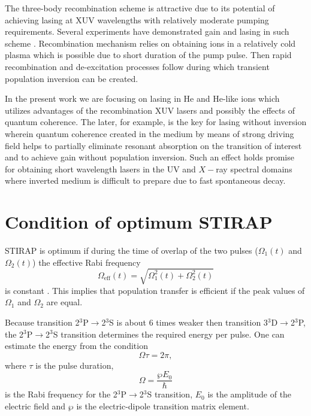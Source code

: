 \documentclass[preprint,preprintnumbers]{revtex4}
\begin{document}
The three-body recombination scheme is attractive due to its potential of
achieving lasing at XUV wavelengths with relatively moderate pumping
requirements. Several experiments have demonstrated gain and lasing in such
scheme \cite{Naga93,Krus96,Koro96}. Recombination mechanism relies on
obtaining ions in a relatively cold plasma which is possible due to short
duration of the pump pulse. Then rapid recombination and de-excitation
processes follow during which transient population inversion can be created.

In the present work we are focusing on lasing in He and He-like ions which
utilizes advantages of the recombination XUV lasers and possibly the effects
of quantum coherence. The later, for example, is the key for lasing without
inversion wherein quantum coherence created in the medium by means of strong
driving field helps to partially eliminate resonant absorption on the
transition of interest and to achieve gain without population inversion.
Such an effect holds promise for obtaining short wavelength lasers in the UV
and $X-$ray spectral domains where inverted medium is difficult to prepare
due to fast spontaneous decay.

\appendix

\section{Condition of optimum STIRAP}

STIRAP is optimum if during the time of overlap of the two pulses ($\Omega
_{1}(t)$ and $\Omega _{2}(t)$) the effective Rabi frequency
\begin{equation}
\Omega _{\text{eff}}(t)=\sqrt{\Omega _{1}^{2}(t)+\Omega _{2}^{2}(t)}
\end{equation}%
is constant \cite{Berg98}. This implies that population transfer is
efficient if the peak values of $\Omega _{1}$ and $\Omega _{2}$ are equal.

Because transition 2$^{3}$P$\rightarrow $2$^{3}$S is about $6$ times weaker
then transition 3$^{3}$D$\rightarrow $2$^{3}$P, the 2$^{3}$P$\rightarrow $2$%
^{3}$S transition determines the required energy per pulse. One can estimate
the energy from the condition%
\begin{equation}
\Omega \tau =2\pi ,  \label{s0}
\end{equation}%
where $\tau $ is the pulse duration,
\begin{equation}
\Omega =\frac{\wp E_{0}}{\hbar }  \label{s0a}
\end{equation}%
is the Rabi frequency for the 2$^{3}$P$\rightarrow $2$^{3}$S transition, $%
E_{0}$ is the amplitude of the electric field and $\wp $ is the
electric-dipole transition matrix element.
\end{document}
